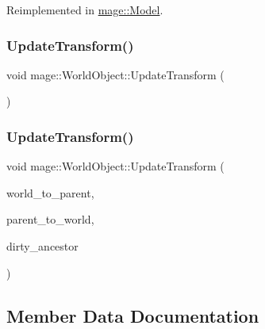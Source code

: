 Reimplemented in \hyperlink{classmage_1_1_model_a2f3c812220367093bdca125e6b6e898a}{mage\+::\+Model}.

\hypertarget{classmage_1_1_world_object_a5ab5e580caa80d93a3c8b44d18ee2848}{}\label{classmage_1_1_world_object_a5ab5e580caa80d93a3c8b44d18ee2848} 
\subsubsection{\texorpdfstring{Update\+Transform()}{UpdateTransform()}\hspace{0.1cm}{\footnotesize\ttfamily [1/2]}}
{\footnotesize\ttfamily void mage\+::\+World\+Object\+::\+Update\+Transform (\begin{DoxyParamCaption}{ }\end{DoxyParamCaption})}

\hypertarget{classmage_1_1_world_object_a1c4736646ad66488fe2e0706a784924d}{}\label{classmage_1_1_world_object_a1c4736646ad66488fe2e0706a784924d} 
\subsubsection{\texorpdfstring{Update\+Transform()}{UpdateTransform()}\hspace{0.1cm}{\footnotesize\ttfamily [2/2]}}
{\footnotesize\ttfamily void mage\+::\+World\+Object\+::\+Update\+Transform (\begin{DoxyParamCaption}\item[{const X\+M\+M\+A\+T\+R\+IX \&}]{world\+\_\+to\+\_\+parent,  }\item[{const X\+M\+M\+A\+T\+R\+IX \&}]{parent\+\_\+to\+\_\+world,  }\item[{bool}]{dirty\+\_\+ancestor }\end{DoxyParamCaption})\hspace{0.3cm}{\ttfamily [protected]}}



\subsection{Member Data Documentation}
\hypertarget{classmage_1_1_world_object_a383cc5e1275f389459021a16b958049c}{}\label{classmage_1_1_world_object_a383cc5e1275f389459021a16b958049c} 
